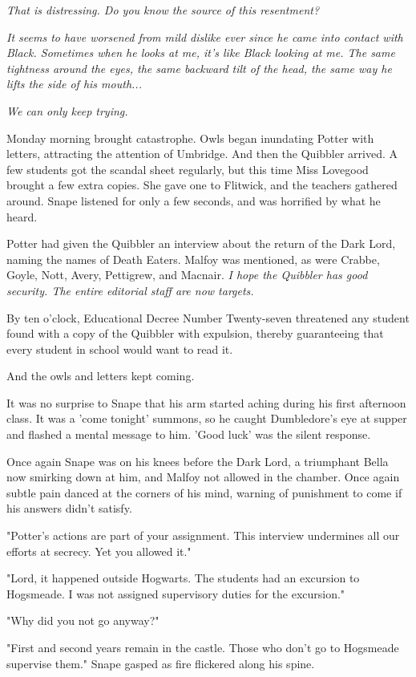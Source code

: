 \documentclass[a4paper,11pt]{article}
\begin{document}
\emph{That is distressing. Do you know the source of this resentment?}

\emph{It seems to have worsened from mild dislike ever since he came into contact with Black. Sometimes when he looks at me, it's like Black looking at me. The same tightness around the eyes, the same backward tilt of the head, the same way he lifts the side of his mouth...}

\emph{We can only keep trying.}

Monday morning brought catastrophe. Owls began inundating Potter with letters, attracting the attention of Umbridge. And then the Quibbler arrived. A few students got the scandal sheet regularly, but this time Miss Lovegood brought a few extra copies. She gave one to Flitwick, and the teachers gathered around. Snape listened for only a few seconds, and was horrified by what he heard.

Potter had given the Quibbler an interview about the return of the Dark Lord, naming the names of Death Eaters. Malfoy was mentioned, as were Crabbe, Goyle, Nott, Avery, Pettigrew, and Macnair. \emph{I hope the Quibbler has good security. The entire editorial staff are now targets.}

By ten o'clock, Educational Decree Number Twenty-seven threatened any student found with a copy of the Quibbler with expulsion, thereby guaranteeing that every student in school would want to read it.

And the owls and letters kept coming.

It was no surprise to Snape that his arm started aching during his first afternoon class. It was a 'come tonight' summons, so he caught Dumbledore's eye at supper and flashed a mental message to him. 'Good luck' was the silent response.

Once again Snape was on his knees before the Dark Lord, a triumphant Bella now smirking down at him, and Malfoy not allowed in the chamber. Once again subtle pain danced at the corners of his mind, warning of punishment to come if his answers didn't satisfy.

"Potter's actions are part of your assignment. This interview undermines all our efforts at secrecy. Yet you allowed it."

"Lord, it happened outside Hogwarts. The students had an excursion to Hogsmeade. I was not assigned supervisory duties for the excursion."

"Why did you not go anyway?"

"First and second years remain in the castle. Those who don't go to Hogsmeade supervise them." Snape gasped as fire flickered along his spine.
\end{document}

